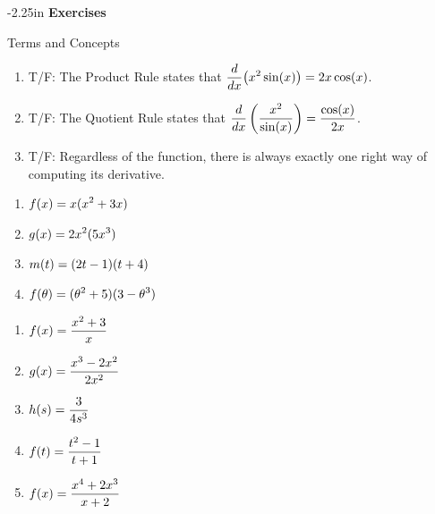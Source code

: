 \begin{adjustwidth*}{}{-2.25in}
\textbf{{\large Exercises}}
\setlength{\columnsep}{25pt}
\begin{multicols*}{2}
\noindent Terms and Concepts \small
\begin{enumerate}[1)]
\item T/F: The Product Rule states that $\displaystyle \frac{d}{dx}\big(x^2\sin(x)\big) = 2x\cos(x)$.
\item T/F: The Quotient Rule states that $\displaystyle \frac{d}{dx}\left(\frac{x^2}{\sin(x)}\right) = \frac{\cos(x)}{2x}$.
\item T/F: Regardless of the function, there is always exactly one right way of computing its derivative.
\end{enumerate} 

 \small


\begin{enumerate}[1),resume]
\item $\displaystyle f(x) = x(x^2 + 3x)$
\item $\displaystyle g(x) = 2x^2(5x^3)$
\item $\displaystyle m(t) = (2t-1)(t+4)$
\item $\displaystyle f(\theta) = (\theta^2 + 5)(3-\theta^3)$
\end{enumerate}


\begin{enumerate}[1),resume]
\item $\displaystyle f(x) = \frac{x^2 + 3}{x}$
\item $\displaystyle g(x) = \frac{x^3 - 2x^2}{2x^2}$
\item $\displaystyle h(s) = \frac{3}{4s^3}$
\item $\displaystyle f(t) = \frac{t^2 - 1}{t + 1}$
\item $\displaystyle f(x) = \frac{x^4 + 2x^3}{x + 2}$
\end{enumerate}


\end{multicols*}
\end{adjustwidth*}
